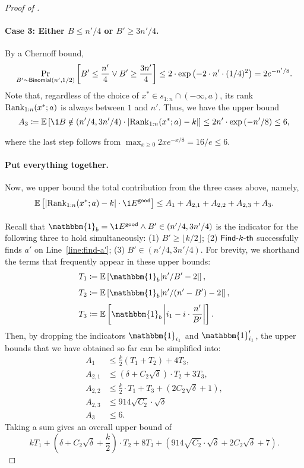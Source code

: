 \begin{proof}[Proof of ]
\paragraph{Case 3: Either $B \le n'/4$ or $B' \ge 3n'/4$.} By a Chernoff bound,
\[
    \Pr_{B' \sim \mathsf{Binomial}\left(n', 1/2\right)}\left[B' \le \frac{n'}{4} \vee B' \ge \frac{3n'}{4}\right]  \le 2\cdot\exp\left(-2\cdot n' \cdot (1/4)^2\right) = 2e^{-n'/8}.
\]
Note that, regardless of the choice of $x^* \in s_{1:n} \cap (-\infty, a)$, its rank $\mathrm{Rank}_{1:n}(x^*; a)$ is always between $1$ and $n'$. Thus, we have the upper bound
\[
    A_3 \coloneqq \Ex{}{\1{B \notin (n'/4, 3n'/4)}\cdot\left|\rank_{1:n}(x^*; a) - k\right|}
\le 2n'\cdot \exp\left(-n'/8\right) \le 6,
\]
where the last step follows from $\max_{x \ge 0}2xe^{-x/8} = 16 / e \le 6$.

\paragraph{Put everything together.} Now, we upper bound the total contribution from the three cases above, namely, 
\[
    \Ex{}{\left|\rank_{1:n}(x^*; a) - k\right| \cdot \1{\goodevent}}
\le A_1 + A_{2,1} + A_{2,2} + A_{2,3} + A_3.
\]

Recall that $\mathbbm{1}_{b} = \1{\goodevent \wedge B' \in (n'/4, 3n'/4)}$ is the indicator for the following three to hold simultaneously: (1) $B' \ge \lfloor k/2\rfloor$; (2) $\textsf{Find-}k\textsf{-th}$ successfully finds $a'$ on Line~\ref{line:find-a'}; (3) $B' \in (n'/4, 3n'/4)$. For brevity, we shorthand the terms that frequently appear in these upper bounds: 
\begin{align*}
    T_1& \coloneqq \Ex{}{\mathbbm{1}_b|n'/B' - 2|},\\
    T_2 &\coloneqq \Ex{}{\mathbbm{1}_b|n'/(n' - B') - 2|},\\
    T_3 & \coloneqq \Ex{}{\mathbbm{1}_b\left|i_1 - i\cdot \frac{n'}{B'}\right|}.
\end{align*}
Then, by dropping the indicators $\mathbbm{1}_{i_1}$ and $\mathbbm{1}'_{i_1}$, the upper bounds that we have obtained so far can be simplified into:
\begin{align*}
    A_1 &\le \frac{k}{2}(T_1 + T_2) + 4T_3,\\
    A_{2, 1} & \le \left(\delta + C_2\sqrt{\delta}\right)\cdot T_2 + 3T_3,\\
    A_{2, 2} & \le \frac{k}{2}\cdot T_1 + T_3 + \left(2C_2\sqrt{\delta} + 1\right),\\
    A_{2, 3} & \le  914\sqrt{C_2}\cdot\sqrt{\delta}\\
    A_3 & \le 6.
\end{align*}
Taking a sum gives an overall upper bound of
\begin{equation}\label{eq:overall-bound-unsimplified}
    kT_1 + \left(\delta + C_2\sqrt{\delta} + \frac{k}{2}\right)\cdot T_2 + 8T_3 + \left(914\sqrt{C_2}\cdot\sqrt{\delta} + 2C_2\sqrt{\delta} + 7\right).
\end{equation}


\end{proof}
